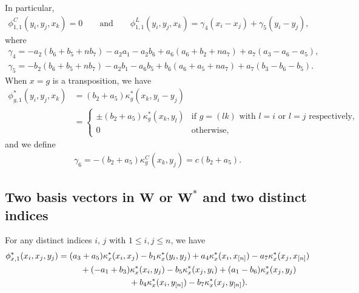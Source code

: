 \documentclass[10pt,a4paper]{amsart}
\numberwithin{equation}{section}
\begin{document}
In particular,
\begin{gather*}
\phi_{1,1}^C(y_i,y_j,x_k)
=0 \qquad \text{and} \qquad \phi_{1,1}^L(y_i,y_j,x_k)
=\gamma_4(x_i-x_j)+\gamma_5(y_i-y_j),
\end{gather*}
where
\begin{gather*}
\gamma_4=-a_2(b_6 + b_5 + nb_7) - a_2 a_1 - a_2 b_6 + a_6(a_6 + b_2 + na_7) + a_7(a_3 - a_6 - a_5), \\
\gamma_5=-b_2(b_6 + b_5 + nb_7) - a_2 b_1 - a_6 b_5 + b_6(a_6 + a_5 + na_7) + a_7(b_3 - b_6 - b_5).
\end{gather*}
When $x=g$ is a transposition, we have
\begin{align*}
\phi_{g,1}^*(y_i,y_j,x_k)&=(b_2 + a_5)\kappa^*_g(x_k,y_i-y_j) \\
&=
\begin{cases}
 \pm(b_2 + a_5)\kappa^*_g(x_k,y_l) & \text{if\ \ $g=(lk)$\ \ with\ \ $l=i$\ \ or\ \ $l=j$\ \ respectively}, \\
 0 & \text{otherwise},
\end{cases}
\end{align*}
and we define
\begin{gather*}
\gamma_6=-(b_2 + a_5)\kappa_g^C(x_k,y_j)=c(b_2 + a_5).
\end{gather*}

\subsection[Two basis vectors in W or W^* and two distinct indices]
{Two basis vectors in $\boldsymbol W$ or $\boldsymbol {W^*}$ and two distinct indices}\label{TwoVecInWTwoIndices}

For any distinct indices $i$, $j$ with $1 \leq i, j \leq n$, we have
\begin{gather*}
\phi_{x,1}^*(x_i,x_j,y_j)
=(a_3+a_5) \kappa^*_x(x_i,x_j) - b_1 \kappa^*_x(y_i,y_j) + a_4 \kappa^*_x(x_i,x_{[n]}) - a_7 \kappa^*_x(x_j,x_{[n]})
\\ \hphantom{\phi_{x,1}^*(x_i,x_j,y_j)=}
{}+(-a_1+b_3) \kappa^*_x(x_i,y_j) - b_5 \kappa^*_x(x_j,y_i) + (a_1-b_6) \kappa^*_x(x_j,y_j)
\\ \hphantom{\phi_{x,1}^*(x_i,x_j,y_j)=}
{}+ b_4 \kappa^*_x(x_i,y_{[n]}) - b_7 \kappa^*_x(x_j,y_{[n]}).
\end{gather*}
\end{document}

